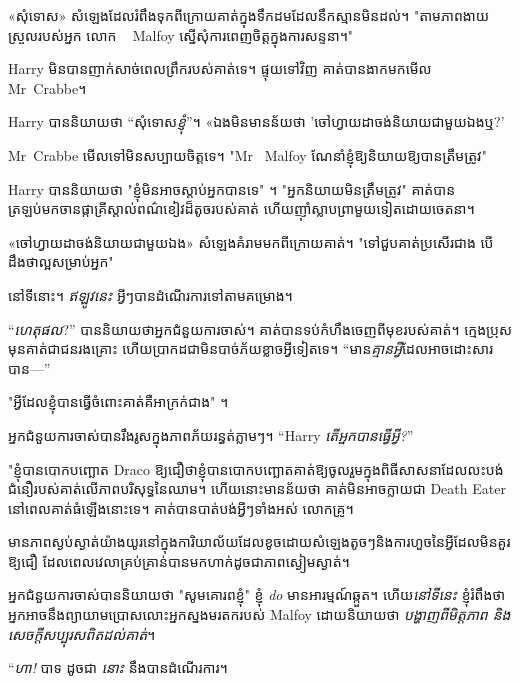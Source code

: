 «សុំទោស» សំឡេងដែលរំពឹងទុកពីក្រោយគាត់ក្នុងទឹកដមដែលនឹកស្មានមិនដល់។ "តាមភាពងាយស្រួលរបស់អ្នក លោក ~ Malfoy ស្នើសុំការពេញចិត្តក្នុងការសន្ទនា។"

Harry មិន​បាន​ញាក់​សាច់​ពេល​ព្រឹក​របស់​គាត់​ទេ។ ផ្ទុយទៅវិញ គាត់បានងាកមកមើល Mr~Crabbe។

Harry បាននិយាយថា “សុំទោស\emph{ខ្ញុំ}”។ «ឯងមិនមានន័យថា 'ចៅហ្វាយដាចង់និយាយជាមួយឯងឬ?'

Mr~Crabbe មើលទៅមិនសប្បាយចិត្តទេ។ "Mr~ Malfoy ណែនាំខ្ញុំឱ្យនិយាយឱ្យបានត្រឹមត្រូវ"

Harry បាននិយាយថា "ខ្ញុំមិនអាចស្តាប់អ្នកបានទេ" ។ "អ្នកនិយាយមិនត្រឹមត្រូវ" គាត់បានត្រឡប់មកចានផ្កាគ្រីស្តាល់ពណ៌ខៀវដ៏តូចរបស់គាត់ ហើយញ៉ាំស្លាបព្រាមួយទៀតដោយចេតនា។

«ចៅហ្វាយ​ដា​ចង់​និយាយ​ជាមួយ​ឯង» សំឡេង​គំរាម​មក​ពី​ក្រោយ​គាត់។ "ទៅជួបគាត់ប្រសើរជាង បើដឹងថាល្អសម្រាប់អ្នក"

នៅទីនោះ។ \emph{ឥឡូវ​នេះ} អ្វីៗ​បាន​ដំណើរការ​ទៅ​តាម​គម្រោង។


“\emph{ហេតុផល}?” បាននិយាយថាអ្នកជំនួយការចាស់។ គាត់បានទប់កំហឹងចេញពីមុខរបស់គាត់។ ក្មេង​ប្រុស​មុន​គាត់​ជា​ជន​រង​គ្រោះ ហើយ​ប្រាកដ​ជា​មិន​បាច់​ភ័យ​ខ្លាច​អ្វី​ទៀត​ទេ។ “មាន\emph{គ្មានអ្វី}ដែលអាចដោះសារបាន—”

"អ្វីដែលខ្ញុំបានធ្វើចំពោះគាត់គឺអាក្រក់ជាង" ។

អ្នកជំនួយការចាស់បានរឹងរូសក្នុងភាពភ័យរន្ធត់ភ្លាមៗ។ “Harry \emph{តើអ្នកបានធ្វើអ្វី?}”

"ខ្ញុំបានបោកបញ្ឆោត Draco ឱ្យជឿថាខ្ញុំបានបោកបញ្ឆោតគាត់ឱ្យចូលរួមក្នុងពិធីសាសនាដែលលះបង់ជំនឿរបស់គាត់លើភាពបរិសុទ្ធនៃឈាម។ ហើយនោះមានន័យថា គាត់មិនអាចក្លាយជា Death Eater នៅពេលគាត់ធំឡើងនោះទេ។ គាត់បានបាត់បង់អ្វីៗទាំងអស់ លោកគ្រូ។

មាន​ភាព​ស្ងប់ស្ងាត់​យ៉ាង​យូរ​នៅ​ក្នុង​ការិយាល័យ​ដែល​ខូច​ដោយ​សំឡេង​តូច​ៗ​និង​ការ​ហួច​នៃ​អ្វី​ដែល​មិន​គួរ​ឱ្យ​ជឿ ដែល​ពេល​វេលា​គ្រប់គ្រាន់​បាន​មក​ហាក់​ដូច​ជា​ភាព​ស្ងៀម​ស្ងាត់។

អ្នកជំនួយការចាស់បាននិយាយថា "សូមគោរពខ្ញុំ" ខ្ញុំ \emph{do} មានអារម្មណ៍ឆ្កួត។ ហើយ\emph{នៅទីនេះ} ខ្ញុំរំពឹងថាអ្នកអាចនឹងព្យាយាមប្រោសលោះអ្នកស្នងមរតករបស់ Malfoy ដោយនិយាយថា \emph{បង្ហាញពីមិត្តភាព និងសេចក្តីសប្បុរសពិតដល់គាត់}។

“\emph{ហា!} បាទ ដូចជា \emph{នោះ} នឹងបានដំណើរការ។

